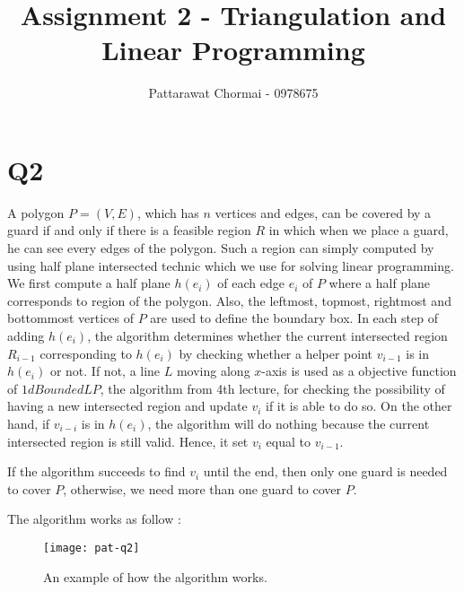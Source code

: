 \documentclass[12pt]{article}
\begin{document}
\title{Assignment 2 - Triangulation and Linear Programming}
\author{
	Pattarawat Chormai - 0978675 \\
}
\maketitle

\section*{Q2}

A polygon $P=(V,E)$, which has $n$ vertices and edges, can be covered by a guard if and only if there is a feasible region $R$ in
which when we place a guard, he can see every edges of the polygon. Such a region
can simply computed by using half plane intersected technic which we use for solving linear programming. \\

We first compute a half plane $h(e_i)$ of each edge $e_i$ of $P$ where a half plane corresponds to
region of the polygon. Also, the leftmost, topmost, rightmost and bottommost vertices of $P$ are used to define the
boundary box. In each step of adding $h(e_i)$, the algorithm determines whether
the current intersected region $R_{i-1}$ corresponding to $h(e_{i})$ by checking whether a helper point $v_{i-1}$
is in $h(e_i)$ or not. If not, a line $L$ moving along $x$-axis is used as a objective function of $1dBoundedLP$,
the algorithm from 4th lecture, for checking the possibility of having a new intersected region
and update $v_i$ if it is able to do so. On the other hand, if $v_{i-i}$ is in $h(e_i)$, the algorithm will do nothing because
the current intersected region is still valid. Hence, it set $v_i$ equal to $v_{i-1}$.

If the algorithm succeeds to find $v_i$ until the end, then only one guard is needed
to cover $P$, otherwise, we need more than one guard to cover $P$.


The algorithm works as follow :

\begin{center}
    \label{figure1}
    \begin{figure}[h]
    \centering
    \texttt{[image: pat-q2]}\\
    \caption{An example of how the algorithm works.} \label{fig:extremecase}
    \end{figure}
\end{center}
\end{document}
